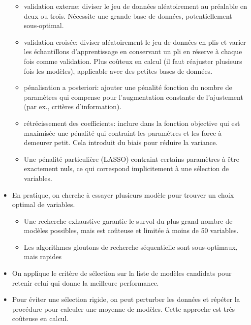 \documentclass[
  11pt,
  letterpaper,
]{book}
\providecommand{\tightlist}{%
  \setlength{\itemsep}{0pt}\setlength{\parskip}{0pt}}\usepackage{longtable,booktabs,array}
\theoremstyle{definition}
\theoremstyle{remark}
\begin{document}
\begin{tcolorbox}
\begin{itemize}
  \begin{itemize}
  \tightlist
  \item
    validation externe: diviser le jeu de données aléatoirement au
    préalable en deux ou trois. Nécessite une grande base de données,
    potentiellement sous-optimal.
  \item
    validation croisée: diviser aléatoirement le jeu de données en plis
    et varier les échantillons d'apprentissage en conservant un pli en
    réserve à chaque fois comme validation. Plus coûteux en calcul (il
    faut réajuster plusieurs fois les modèles), applicable avec des
    petites bases de données.
  \item
    pénalisation a posteriori: ajouter une pénalité fonction du nombre
    de paramètres qui compense pour l'augmentation constante de
    l'ajustement (par ex., critères d'information).
  \item
    rétrécissement des coefficients: inclure dans la fonction objective
    qui est maximisée une pénalité qui contraint les paramètres et les
    force à demeurer petit. Cela introduit du biais pour réduire la
    variance.
  \item
    Une pénalité particulière (LASSO) contraint certains paramètres à
    être exactement nuls, ce qui correspond implicitement à une
    sélection de variables.
  \end{itemize}
\item
  En pratique, on cherche à essayer plusieurs modèle pour trouver un
  choix optimal de variables.

  \begin{itemize}
  \tightlist
  \item
    Une recherche exhaustive garantie le survol du plus grand nombre de
    modèles possibles, mais est coûteuse et limitée à moins de 50
    variables.
  \item
    Les algorithmes gloutons de recherche séquentielle sont
    sous-optimaux, mais rapides
  \end{itemize}
\item
  On applique le critère de sélection sur la liste de modèles candidats
  pour retenir celui qui donne la meilleure performance.
\item
  Pour éviter une sélection rigide, on peut perturber les données et
  répéter la procédure pour calculer une moyenne de modèles. Cette
  approche est très coûteuse en calcul.
\end{itemize}

\end{tcolorbox}
\end{document}
